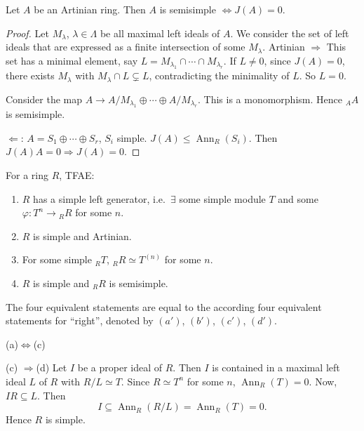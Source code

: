 \documentclass[11pt, a4paper]{report}
\begin{document}
\begin{theorem}
Let $A$ be an Artinian ring. Then $A$ is semisimple $\Leftrightarrow J(A)=0$.
\end{theorem}

\begin{proof}
Let $M_{\lambda}$, $\lambda \in \Lambda$ be all maximal left ideals of $A$. We consider the set of left ideals that are expressed as a finite intersection of some $M_{\lambda}$. Artinian $\Rightarrow$ This set has a minimal element, say $L=M_{\lambda_{1}} \cap \cdots \cap M_{\lambda_r}$. If $L \neq 0$, since $J(A)=0$, there exists $M_{\lambda}$ with $M_{\lambda} \cap L \subsetneq L$, contradicting the minimality of $L$. So $L=0$.

Consider the map $A \rightarrow A/M_{\lambda_{1}} \oplus \cdots \oplus A/M_{\lambda_r}$. This is a monomorphism. Hence ${}_AA$ is semisimple.

$\Leftarrow$: $A=S_{1} \oplus \cdots \oplus S_{r}$, $S_i$ simple. $J(A) \leq \operatorname{Ann}_R(S_{i})$. Then $J(A)A=0 \Rightarrow J(A)=0$.
\end{proof}

\begin{proposition}
For a ring $R$, TFAE:
\begin{enumerate}
\item[(a)] $R$ has a simple left generator, i.e.\ $\exists$ some simple module $T$ and some $\varphi: T^{n} \rightarrow {}_RR$ for some $n$.
\item[(b)] $R$ is simple and Artinian.
\item[(c)] For some simple ${}_RT$, ${}_RR \simeq T^{(n)}$ for some $n$.
\item[(d)] $R$ is simple and ${}_RR$ is semisimple.
\end{enumerate}
\end{proposition}

\begin{remark}
The four equivalent statements are equal to the according four equivalent statements for ``right'', denoted by $(a')$, $(b')$, $(c')$, $(d')$.
\end{remark}
(a)$\Leftrightarrow$(c)

(c) $\Rightarrow$(d) Let $I$ be a proper ideal of $R$. Then $I$ is contained in a maximal left ideal $L$ of $R$ with $R/L \simeq T$. Since $R \simeq T^{n}$ for some $n$, $\operatorname{Ann}_{R}(T)=0$. Now, $IR \subseteq L$. Then
\[
I \subseteq \operatorname{Ann}_{R}(R/L)=\operatorname{Ann}_{R}(T)=0.
\]
Hence $R$ is simple.
\end{document}

